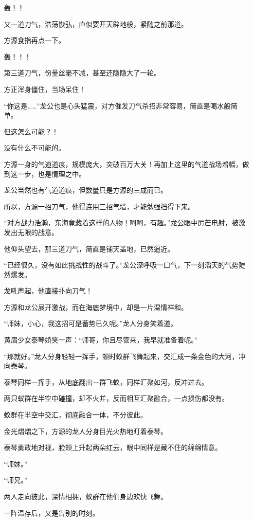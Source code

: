 \begin{this_body}
轰！！

又一道刀气，浩荡恢弘，直似要开天辟地般，紧随之前那道。

方源食指再点一下。

轰！！！

第三道刀气，份量丝毫不减，甚至还隐隐大了一轮。

方正浑身僵住，当场呆住！

“你这是……”龙公也是心头猛震，对方催发刀气杀招非常容易，简直是喝水般简单。

但这怎么可能？！

没有什么不可能的。

方源一身的气道道痕，规模庞大，突破百万大关！再加上这里的气道战场增幅，做到这一步，也是情理之中。

龙公当然也有气道道痕，但数量只是方源的三成而已。

所以，方源一招刀气，他得连用三招气墙，才能勉强挡得下来。

“对方战力浩瀚，东海竟藏着这样的人物！呵呵，有趣。”龙公眼中厉芒电射，被激发出无限的战意。

他仰头望去，那三道刀气，简直是铺天盖地，已然逼近。

“已经很久，没有如此挑战性的战斗了。”龙公深呼吸一口气，下一刻滔天的气势陡然爆发。

龙吼声起，他直接扑向刀气！

方源和龙公展开激战，而在海底梦境中，却是一片温情祥和。

“师妹，小心，我这招可是蓄势已久呢。”龙人分身笑着道。

黄眉少女泰琴娇笑一声：“师哥，你且尽管来，我早就准备着呢。”

“那就好。”龙人分身轻轻一挥手，顿时蚁群飞舞起来，交汇成一条金色的大河，冲向泰琴。

泰琴同样一挥手，从地底翻出一群飞蚁，同样汇聚如河，反冲过去。

两只蚁群在半空中碰撞，却不火并，反而相互汇聚融合，一点损伤都没有。

蚁群在半空中交汇，彻底融合一体，不分彼此。

金光熠熠之下，方源的龙人分身目光火热地盯着泰琴。

泰琴勇敢地对视，脸颊上升起两朵红云，眼中同样是藏不住的绵绵情意。

“师妹。”

“师兄。”

两人走向彼此，深情相拥，蚁群在他们身边欢快飞舞。

一阵温存后，又是告别的时刻。


\end{this_body}
